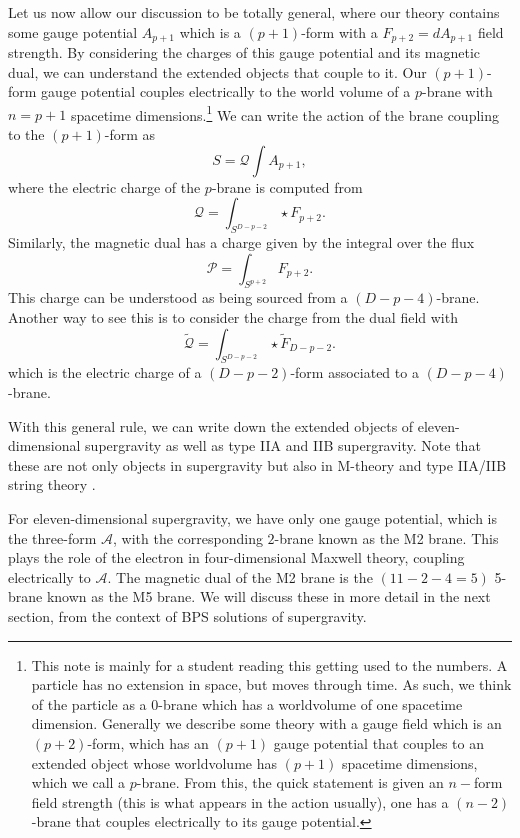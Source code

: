 Let us now allow our discussion to be totally general, where our theory contains some gauge potential $A_{p+1}$ which is a $(p+1)$-form with a $F_{p+2} = dA_{p+1}$ field strength. By considering the charges of this gauge potential and its magnetic dual, we can understand the extended objects that couple to it. Our $(p+1)$-form gauge potential couples electrically to the world volume of a $p$-brane with $n = p+1$ spacetime dimensions.\footnote{This note is mainly for a student reading this getting used to the numbers. A particle has no extension in space, but moves through time. As such, we think of the particle as a 0-brane which has a worldvolume of one spacetime dimension. Generally we describe some theory with a gauge field which is an $(p+2)$-form, which has an $(p+1)$ gauge potential that couples to an extended object whose worldvolume has $(p+1)$ spacetime dimensions, which we call a $p$-brane. From this, the quick statement is given an $n-$form field strength (this is what appears in the action usually), one has a $(n-2)$-brane that couples electrically to its gauge potential.} We can write the action of the brane coupling to the $(p+1)$-form as
\begin{equation*}
	S = \mathcal{Q} \int A_{p+1},
\end{equation*}
where the electric charge of the $p$-brane is computed from
\begin{equation*}
	\mathcal{Q} = \int_{S^{D - p - 2}} \star F_{p+2}.
\end{equation*}
Similarly, the magnetic dual has a charge given by the integral over the flux
\begin{equation*}
	\mathcal{P} = \int_{S^{p+2}} F_{p+2}.
\end{equation*}
This charge can be understood as being sourced from a $(D-p-4)$-brane. Another way to see this is to consider the charge from the dual field with
\begin{equation*}
	\mathcal{\tilde{Q}} = \int_{S^{D - p - 2}} \star \tilde{F}_{D - p - 2}.
\end{equation*}
which is the electric charge of a $(D-p-2)$-form associated to a $(D-p-4)$-brane.

With this general rule, we can write down the extended objects of eleven-dimensional supergravity as well as type IIA and IIB supergravity. Note that these are not only objects in supergravity but also in M-theory and type IIA/IIB string theory \cite{Duff:1993ye}. 

For eleven-dimensional supergravity, we have only one gauge potential, which is the three-form $\mathcal{A}$, with the corresponding $2$-brane known as the M2 brane. This plays the role of the electron in four-dimensional Maxwell theory, coupling electrically to $\mathcal{A}$. The magnetic dual of the M2 brane is the $(11 - 2 - 4 = 5)$ 5-brane known as the M5 brane. We will discuss these in more detail in the next section, from the context of BPS solutions of supergravity.


